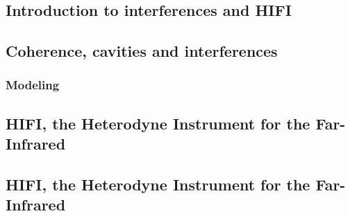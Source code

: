 \cleardoublepage
\begin{refsection}
\chapter{Introduction to interferences and HIFI}
\label{sec:chapter1}


\section{Coherence, cavities and interferences}

\subsection{Modeling}

\section{HIFI, the Heterodyne Instrument for the Far-Infrared}

\section{HIFI, the Heterodyne Instrument for the Far-Infrared}

\printbibliography[heading=subbibliography]
\end{refsection}
